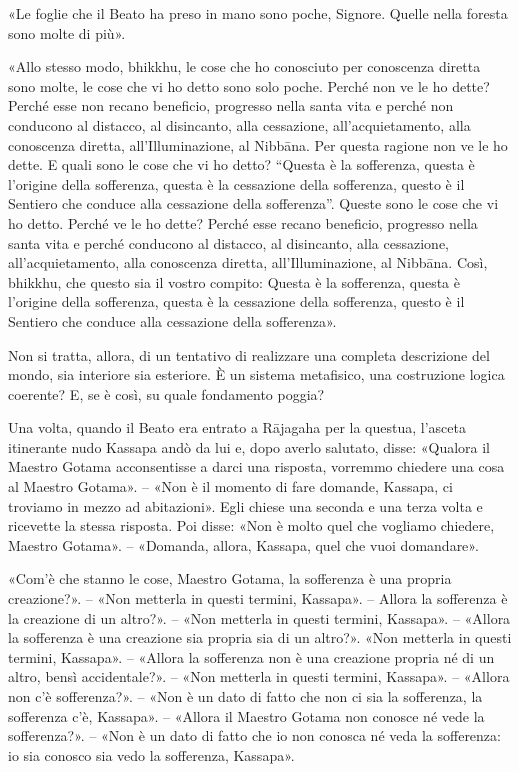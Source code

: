 «Le foglie che il Beato ha preso in mano sono poche, Signore. Quelle
nella foresta sono molte di più».


«Allo stesso modo, bhikkhu, le cose che ho conosciuto per conoscenza
diretta sono molte, le cose che vi ho detto sono solo poche. Perché non
ve le ho dette? Perché esse non recano beneficio, progresso nella santa
vita e perché non conducono al distacco, al disincanto, alla cessazione,
all’acquietamento, alla conoscenza diretta, all’Illuminazione, al
Nibbāna. Per questa ragione non ve le ho dette. E quali sono le cose che
vi ho detto? “Questa è la sofferenza, questa è l’origine della
sofferenza, questa è la cessazione della sofferenza, questo è il
Sentiero che conduce alla cessazione della sofferenza”. Queste sono le
cose che vi ho detto. Perché ve le ho dette? Perché esse recano
beneficio, progresso nella santa vita e perché conducono al distacco, al
disincanto, alla cessazione, all’acquietamento, alla conoscenza diretta,
all’Illuminazione, al Nibbāna. Così, bhikkhu, che questo sia il vostro
compito: Questa è la sofferenza, questa è l’origine della sofferenza,
questa è la cessazione della sofferenza, questo è il Sentiero che
conduce alla cessazione della sofferenza».




 Non si tratta, allora, di un tentativo di realizzare
una completa descrizione del mondo, sia interiore sia esteriore. È un
sistema metafisico, una costruzione logica coerente? E, se è così, su
quale fondamento poggia?


 \label{pag230}Una volta, quando il Beato era entrato a Rājagaha per la
questua, l’asceta itinerante nudo Kassapa andò da lui e, dopo averlo
salutato, disse: «Qualora il Maestro Gotama acconsentisse a darci una
risposta, vorremmo chiedere una cosa al Maestro Gotama». – «Non è il
momento di fare domande, Kassapa, ci troviamo in mezzo ad abitazioni».
Egli chiese una seconda e una terza volta e ricevette la stessa
risposta. Poi disse: «Non è molto quel che vogliamo chiedere, Maestro
Gotama». – «Domanda, allora, Kassapa, quel che vuoi domandare».


«Com’è che stanno le cose, Maestro Gotama, la sofferenza è una propria
creazione?». – «Non metterla in questi termini, Kassapa». – Allora la
sofferenza è la creazione di un altro?». – «Non metterla in questi
termini, Kassapa». – «Allora la sofferenza è una creazione sia propria
sia di un altro?». «Non metterla in questi termini, Kassapa». – «Allora
la sofferenza non è una creazione propria né di un altro, bensì
accidentale?». – «Non metterla in questi termini, Kassapa». – «Allora
non c’è sofferenza?». – «Non è un dato di fatto che non ci sia la
sofferenza, la sofferenza c’è, Kassapa». – «Allora il Maestro Gotama non
conosce né vede la sofferenza?». – «Non è un dato di fatto che io non
conosca né veda la sofferenza: io sia conosco sia vedo la sofferenza,
Kassapa».


